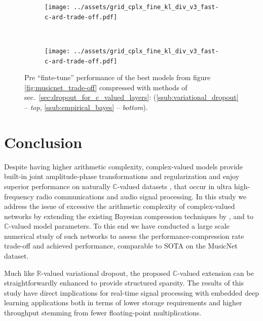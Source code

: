 \documentclass[a4paper,10pt]{article}
\newcommand{\real}{\mathbb{R}}
\newcommand{\cplx}{\mathbb{C}}
\begin{document}
\begin{figure}[!ht]
  \centering
  \begin{subfigure}[b]{0.9\textwidth}  %
    \centering
    \texttt{[image: ../assets/grid\_cplx\_fine\_kl\_div\_v3\_fast-c-ard-trade-off.pdf]}
  \end{subfigure} \\
  \begin{subfigure}[b]{0.9\textwidth}  %
    \centering
    \texttt{[image: ../assets/grid\_cplx\_fine\_kl\_div\_v3\_fast-c-ard-trade-off.pdf]}
  \end{subfigure}
  \caption{%
    Pre ``finte-tune'' performance of the best models from figure \ref{fig:musicnet_trade-off}
    compressed with methods of sec.~\ref{sec:dropout_for_c_valued_layers}:
    (\ref{ssub:variational_dropout} -- \textit{top}, \ref{ssub:empirical_bayes} --  \textit{bottom}).
  }
  \label{fig:musicnet_trade-off_pre_fune-tune}
\end{figure}



\section{Conclusion} %
\label{sec:conclusion}

Despite having higher arithmetic complexity, complex-valued models provide built-in
joint amplitude-phase transformations and regularization \citep{hirose_complex-valued_2009}
and enjoy superior performance on naturally $\cplx$-valued datasets \citep{tarver_design_2019},
that occur in ultra high-frequency radio communications and audio signal processing. In this
study we address the issue of excessive the arithmetic complexity of complex-valued networks
by extending the existing Bayesian compression techniques by \citet{kingma_variational_2015},
\citet{molchanov_variational_2017} and \citet{kharitonov_variational_2018} to $\cplx$-valued
model parameters. To this end we have conducted a large scale numerical study of such networks
to assess the performance-compression rate trade-off and achieved performance, comparable
to SOTA on the MusicNet dataset.

Much like $\real$-valued variational dropout, the proposed $\cplx$-valued extension can be
straightforwardly enhanced to provide structured sparsity. The results of this study have
direct implications for real-time signal processing with embedded deep learning applications
both in terms of lower storage requirements and higher throughput stemming from fewer
floating-point multiplications.
\end{document}

